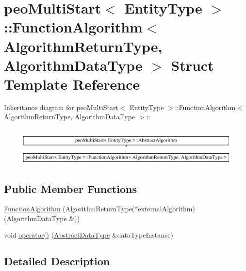 \hypertarget{structpeoMultiStart_1_1FunctionAlgorithm}{
\section{peo\-Multi\-Start$<$ Entity\-Type $>$::Function\-Algorithm$<$ Algorithm\-Return\-Type, Algorithm\-Data\-Type $>$ Struct Template Reference}
\label{structpeoMultiStart_1_1FunctionAlgorithm}
}
Inheritance diagram for peo\-Multi\-Start$<$ Entity\-Type $>$::Function\-Algorithm$<$ Algorithm\-Return\-Type, Algorithm\-Data\-Type $>$::\begin{figure}[H]
\begin{center}
\leavevmode
\includegraphics[height=2cm]{structpeoMultiStart_1_1FunctionAlgorithm}
\end{center}
\end{figure}
\subsection*{Public Member Functions}
\begin{CompactItemize}
\item 
\hypertarget{structpeoMultiStart_1_1FunctionAlgorithm_e17b79bb29dd4f6f2f827970c5aba5fd}{
\hyperlink{structpeoMultiStart_1_1FunctionAlgorithm_e17b79bb29dd4f6f2f827970c5aba5fd}{Function\-Algorithm} (Algorithm\-Return\-Type($\ast$external\-Algorithm)(Algorithm\-Data\-Type \&))}
\label{structpeoMultiStart_1_1FunctionAlgorithm_e17b79bb29dd4f6f2f827970c5aba5fd}

\item 
\hypertarget{structpeoMultiStart_1_1FunctionAlgorithm_134a61668ce76ed36c5d1d454c6b3b43}{
void \hyperlink{structpeoMultiStart_1_1FunctionAlgorithm_134a61668ce76ed36c5d1d454c6b3b43}{operator()} (\hyperlink{structpeoMultiStart_1_1AbstractDataType}{Abstract\-Data\-Type} \&data\-Type\-Instance)}
\label{structpeoMultiStart_1_1FunctionAlgorithm_134a61668ce76ed36c5d1d454c6b3b43}

\end{CompactItemize}


\subsection{Detailed Description}
